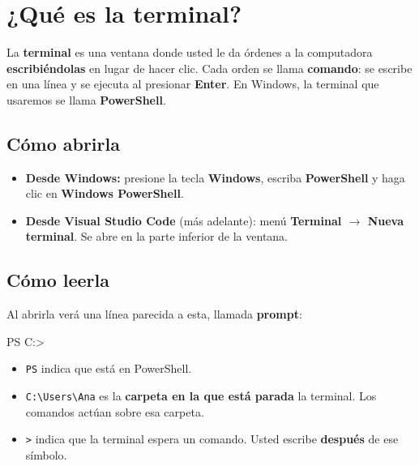 \documentclass[11pt,a4paper]{article}
\newenvironment{terminal}{\begin{tcolorbox}[terminal]}{\end{tcolorbox}}
\begin{document}
\section{¿Qué es la terminal?}

La \textbf{terminal} es una ventana donde usted le da órdenes a la computadora \textbf{escribiéndolas} en lugar de hacer clic. Cada orden se llama \textbf{comando}: se escribe en una línea y se ejecuta al presionar \textbf{Enter}. En Windows, la terminal que usaremos se llama \textbf{PowerShell}.

\subsection{Cómo abrirla}

\begin{itemize}
  \item \textbf{Desde Windows:} presione la tecla \textbf{Windows}, escriba \textbf{PowerShell} y haga clic en \textbf{Windows PowerShell}.
  \item \textbf{Desde Visual Studio Code} (más adelante): menú \textbf{Terminal $\rightarrow$ Nueva terminal}. Se abre en la parte inferior de la ventana.
\end{itemize}

\subsection{Cómo leerla}

Al abrirla verá una línea parecida a esta, llamada \textbf{prompt}:

\begin{terminal}
\begin{comando}
PS C:\Users\Ana>
\end{comando}
\end{terminal}

\begin{itemize}
  \item \texttt{PS} indica que está en PowerShell.
  \item \texttt{C:\textbackslash Users\textbackslash Ana} es la \textbf{carpeta en la que está parada} la terminal. Los comandos actúan sobre esa carpeta.
  \item \texttt{>} indica que la terminal espera un comando. Usted escribe \textbf{después} de ese símbolo.
\end{itemize}
\end{document}
